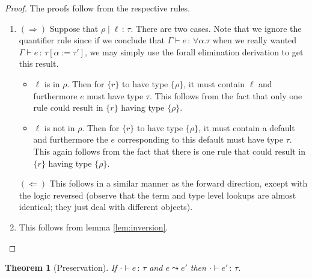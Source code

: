 \documentclass{article}
\newtheorem{theorem}{Theorem}
\newcommand{\hastp}[3]{#1 \vdash #2 \,:\, #3}
\newcommand{\haslbl}[3]{#1\;|\;#2\,:\, #3}
\newcommand{\step}[2]{#1 \leadsto #2}
\begin{document}
\begin{proof}
  The proofs follow from the respective rules.
  \mbox{}
  \begin{enumerate}
  \item \((\Rightarrow)\) Suppose that \(\haslbl \rho \ell \tau\). There are two
    cases. Note that we ignore the quantifier rule since if we conclude that
    \(\hastp \Gamma e {\forall \alpha. \tau}\) when we really wanted \(\hastp
    \Gamma e {\tau[\alpha := \tau']}\), we may simply use the forall elimination
    derivation to get this result.
    \begin{itemize}
    \item \(\ell\) is in \(\rho\). Then for \(\{r\}\) to have type \(\{\rho\}\), it
      must contain \(\ell\) and furthermore \(e\) must have type \(\tau\). This
      follows from the fact that only one rule could result in \(\{r\}\) having
      type \(\{\rho\}\).
    \item \(\ell\) is not in \(\rho\). Then for \(\{r\}\) to have type
      \(\{\rho\}\), it must contain a default and furthermore the \(e\)
      corresponding to this default must have type \(\tau\). This again follows
      from the fact that there is one rule that could result in \(\{r\}\) having
      type \(\{\rho\}\).
    \end{itemize}

    \((\Leftarrow)\) This follows in a similar manner as the forward direction,
    except with the logic reversed (observe that the term and type level lookups
    are almost identical; they just deal with different objects).
  \item This follows from lemma \ref{lem:inversion}.
  \end{enumerate}
\end{proof}

\begin{theorem}[Preservation]
If $\hastp{\cdot}{e}{\tau}$ and $\step{e}{e'}$ then $\hastp{\cdot}{e'}{\tau}$.
\end{theorem}
\end{document}
